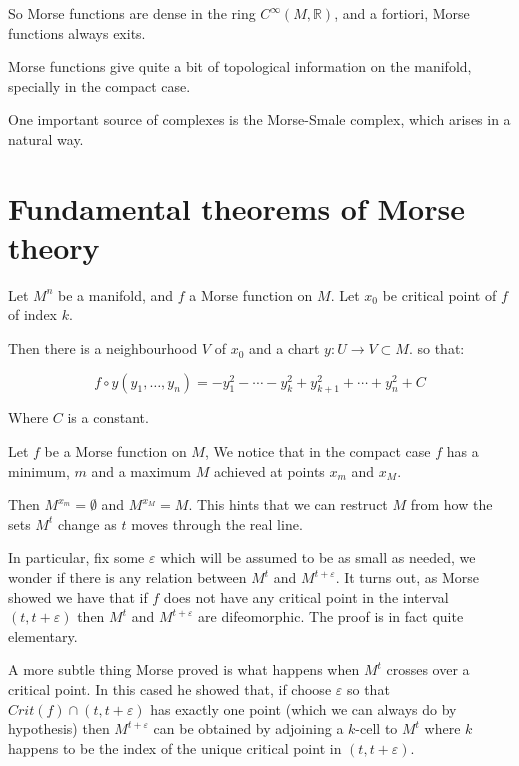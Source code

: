 So Morse functions are dense in the ring $C^\infty(M,\mathbb{R})$,
and a fortiori, Morse functions always exits.

Morse functions give quite a bit of topological information on the manifold,
specially in the compact case. 



One important source of complexes is the Morse-Smale complex,
which arises in a natural way.


\section{Fundamental theorems of Morse theory}

\begin{theorem}
\cite{mat1997}
Let $M^n$ be a manifold, and $f$ a Morse function on $M$.
Let $x_0$ be critical point of $f$ of index $k$.


Then there is a neighbourhood $V$ of $x_0$ and a chart 
$y:U\to V\subset M$. so that:

$$
f\circ y (y_1,\ldots,y_n)
=
-y_1^2
-\cdots
-y_k^2
+y_{k+1}^2
+\cdots
+y_n^2
+C
$$

Where $C$ is a constant.
\end{theorem}

Let $f$ be a Morse function on $M$,
We notice that in the compact case $f$ has 
a minimum, $m$ and a maximum $M$
achieved at points $x_m$ and $x_M$.

Then $M^{x_m}=\emptyset$ and $M^{x_M}=M$.
This hints that we can restruct $M$ from how the sets $M^t$
change as $t$ moves through the real line.

In particular, fix some $\varepsilon$ which will be assumed to be
as small as needed, we wonder if there is any relation between $M^t$
and $M^{t+\varepsilon}$. It turns out, as Morse \cite{mor1934} showed
we have that if $f$ does not have any critical point in the interval 
$(t,t+\varepsilon)$ then
 $M^t$ and $M^{t+\varepsilon}$ are difeomorphic. The proof is
 in fact quite elementary.
 
 A more subtle thing Morse proved is what happens when $M^t$
 crosses over a critical point. In this cased he showed that,
 if choose $\varepsilon$ so that $Crit(f)\cap (t,t+\varepsilon)$
 has exactly one point (which we can always do by hypothesis)
 then
  $M^{t+\varepsilon}$ can be obtained by adjoining a $k$-cell to $M^t$
 where $k$ happens to be the index of the unique critical point in 
$(t,t+\varepsilon)$.


